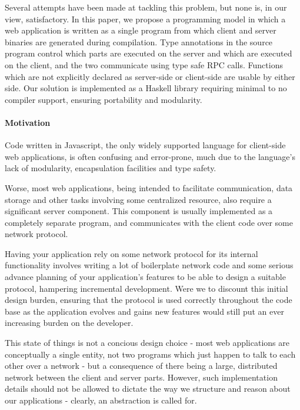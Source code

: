 \documentclass[preprint]{sigplanconf}
\begin{document}
Several attempts have been made at tackling this problem, but none is, in our
view, satisfactory. In this paper, we propose a programming model in which a
web application is written as a single program from which client and server
binaries are generated during compilation. Type annotations in the source
program control which parts are executed on the server and which are executed
on the client, and the two communicate using type safe RPC calls. Functions
which are not explicitly declared as server-side or client-side are usable by
either side. Our solution is implemented as a Haskell library requiring minimal
to no compiler support, ensuring portability and modularity.

\paragraph{Motivation}

Code written in Javascript, the only widely supported language for client-side
web applications, is often confusing and error-prone, much due to the
language's lack of modularity, encapsulation facilities and type safety.

Worse, most web applications, being intended to facilitate communication, data
storage and other tasks involving some centralized resource, also require a
significant server component. This component is usually implemented as a
completely separate program, and communicates with the client code over some
network protocol.

Having your application rely on some network protocol for
its internal functionality involves writing a lot of boilerplate network code
and some serious advance planning of your application's features to be able to
design a suitable protocol, hampering incremental development. Were we to
discount this initial design burden, ensuring that the protocol is used
correctly throughout the code base as the application evolves and gains new
features would still put an ever increasing burden on the developer.

This state of things is not a concious design choice - most web applications
are conceptually a single entity, not two programs which just happen to talk
to each other over a network - but a consequence of there being a large,
distributed network between the client and server parts.
However, such implementation details should not be allowed to dictate the way
we structure and reason about our applications - clearly, an abstraction is
called for.
\end{document}
